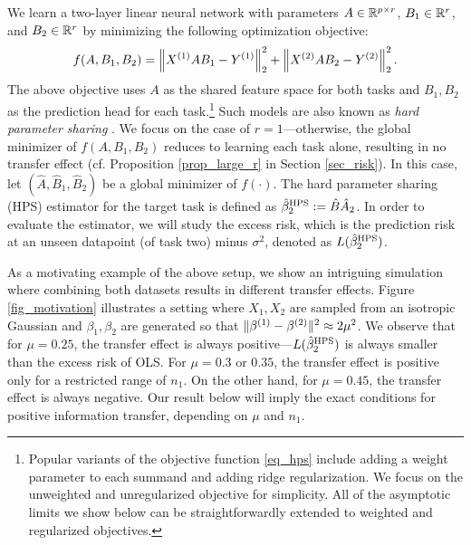 We learn a two-layer linear neural network with parameters $A \in \mathbb{R}^{p\times r}$, $B_1 \in \mathbb{R}^{r}$, and $B_2 \in \mathbb{R}^r$ by minimizing the following optimization objective:
\begin{align}\label{eq_hps}
    f(A, B_1, B_2) = \bignorm{X^{(1)} A B_1 - Y^{(1)}}_2^2 + \bignorm{X^{(2)} A B_2 - Y^{(2)}}_2^2.
\end{align}
The above objective uses $A$ as the shared feature space for both tasks and $B_1, B_2$ as the prediction head for each task.\footnote{Popular variants of the objective function \eqref{eq_hps} include adding a weight parameter to each summand and adding ridge regularization. We focus on the unweighted and unregularized objective for simplicity. All of the asymptotic limits we show below can be straightforwardly extended to weighted and regularized objectives.}
Such models are also known as \textit{hard parameter sharing} \cite{C97,R17}.
We focus on the case of $r = 1$---otherwise, the global minimizer of $f(A, B_1, B_2)$ reduces to learning each task alone, resulting in no transfer effect (cf. Proposition \ref{prop_large_r} in Section \ref{sec_risk}).
In this case, let $(\hat{A}, \hat{B}_1, \hat{B}_2)$ be a global minimizer of $f(\cdot)$.
The hard parameter sharing (HPS) estimator for the target task is defined as $\hat{\beta}_2^{\textup{HPS}} := \hat{B} \hat{A}_2$.
In order to evaluate the estimator, we will study the excess risk, which is the prediction risk at an unseen datapoint (of task two) minus $\sigma^2$, denoted as $L(\hat{\beta}_2^{\textup{HPS}})$.

As a motivating example of the above setup, we show an intriguing simulation where combining both datasets results in different transfer effects.
Figure \ref{fig_motivation} illustrates a setting where $X_1, X_2$ are sampled from an isotropic Gaussian and $\beta_1,\beta_2$ are generated so that $\|\beta^{(1)} - \beta^{(2)}\|^2 \approx 2\mu^2$.
We observe that for $\mu = 0.25$, the transfer effect is always positive---$L(\hat{\beta}_2^{\textup{HPS}})$ is always smaller than the excess risk of OLS.
For $\mu = 0.3$ or $0.35$, the transfer effect is positive only for a restricted range of $n_1$.
On the other hand, for $\mu = 0.45$, the transfer effect is always negative.  
Our result below will imply the exact conditions for positive information transfer, depending on $\mu$ and $n_1$.

